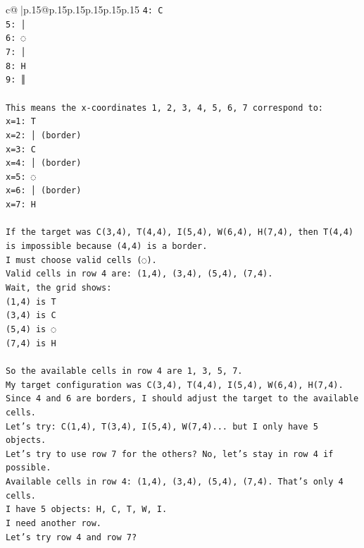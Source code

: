 \documentclass{article}
\begin{document}
{\begin{supertabular}{c@{$\;$}|p{.15\linewidth}@{}p{.15\linewidth}p{.15\linewidth}p{.15\linewidth}p{.15\linewidth}p{.15\linewidth}}
{{{\texttt{4: C} \\
\texttt{5: │} \\
\texttt{6: ◌} \\
\texttt{7: │} \\
\texttt{8: H} \\
\texttt{9: ║} \\
\\ 
\texttt{This means the x{-}coordinates 1, 2, 3, 4, 5, 6, 7 correspond to:} \\
\texttt{x=1: T} \\
\texttt{x=2: │ (border)} \\
\texttt{x=3: C} \\
\texttt{x=4: │ (border)} \\
\texttt{x=5: ◌} \\
\texttt{x=6: │ (border)} \\
\texttt{x=7: H} \\
\\ 
\texttt{If the target was C(3,4), T(4,4), I(5,4), W(6,4), H(7,4), then T(4,4) is impossible because (4,4) is a border.} \\
\texttt{I must choose valid cells (◌).} \\
\texttt{Valid cells in row 4 are: (1,4), (3,4), (5,4), (7,4).} \\
\texttt{Wait, the grid shows:} \\
\texttt{(1,4) is T} \\
\texttt{(3,4) is C} \\
\texttt{(5,4) is ◌} \\
\texttt{(7,4) is H} \\
\\ 
\texttt{So the available cells in row 4 are 1, 3, 5, 7.} \\
\texttt{My target configuration was C(3,4), T(4,4), I(5,4), W(6,4), H(7,4).} \\
\texttt{Since 4 and 6 are borders, I should adjust the target to the available cells.} \\
\texttt{Let's try: C(1,4), T(3,4), I(5,4), W(7,4)... but I only have 5 objects.} \\
\texttt{Let's try to use row 7 for the others? No, let's stay in row 4 if possible.} \\
\texttt{Available cells in row 4: (1,4), (3,4), (5,4), (7,4). That's only 4 cells.} \\
\texttt{I have 5 objects: H, C, T, W, I.} \\
\texttt{I need another row.} \\
\texttt{Let's try row 4 and row 7?} \\
}}}
\end{supertabular}}
\end{document}
